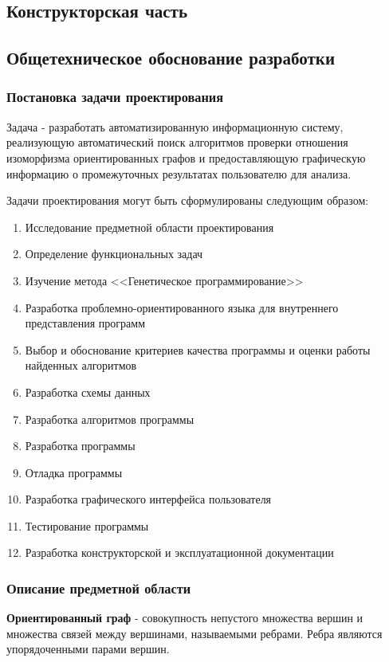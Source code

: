 \documentclass[russian,utf8,emptystyle]{eskdtext}
\begin{document}
\begin{spacing}{1.5}
\newpage
\section{Конструкторская часть}
\subsection{Общетехническое обоснование разработки}
\subsubsection{Постановка задачи проектирования}
Задача - разработать автоматизированную информационную систему, реализующую автоматический поиск алгоритмов проверки отношения изоморфизма ориентированных графов и предоставляющую графическую информацию о промежуточных результатах пользователю для анализа.

Задачи проектирования могут быть сформулированы следующим образом:
\begin{enumerate}
\item Исследование предметной области проектирования
\item Определение функциональных задач
\item Изучение метода <<Генетическое программирование>>
\item Разработка проблемно-ориентированного языка для внутреннего представления программ
\item Выбор и обоснование критериев качества программы и оценки работы найденных алгоритмов
\item Разработка схемы данных
\item Разработка алгоритмов программы
\item Разработка программы
\item Отладка программы
\item Разработка графического интерфейса пользователя
\item Тестирование программы
\item Разработка конструкторской и эксплуатационной документации
\end{enumerate}

\subsubsection{Описание предметной области}
\textbf{Ориентированный граф} - совокупность непустого множества вершин и множества связей между вершинами, называемыми ребрами. Ребра являются упорядоченными парами вершин.


\end{spacing}
\end{document}
